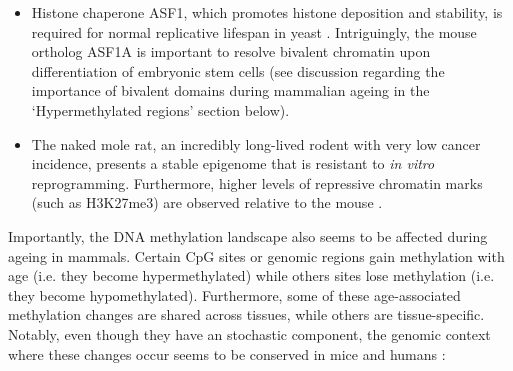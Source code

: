 \begin{itemize}
	\item Histone chaperone ASF1, which promotes histone deposition and stability, is required for normal replicative lifespan in yeast \citep{Feser2010}. Intriguingly, the mouse ortholog ASF1A is important to resolve bivalent chromatin upon differentiation of embryonic stem cells \citep{Gao2018} (see discussion regarding the importance of bivalent domains during mammalian ageing in the `Hypermethylated regions' section below).
	
	\item The naked mole rat, an incredibly long-lived rodent with very low cancer incidence, presents a stable epigenome that is resistant to \textit{in vitro} reprogramming. Furthermore, higher levels of repressive chromatin marks (such as H3K27me3) are observed relative to the mouse \citep{Tan2017}. 
	
\end{itemize}

Importantly, the DNA methylation landscape also seems to be affected during ageing in mammals. Certain CpG sites or genomic regions gain methylation with age (i.e. they become hypermethylated) while others sites lose methylation (i.e. they become hypomethylated). Furthermore, some of these age-associated methylation changes are shared across tissues, while others are tissue-specific. Notably, even though they have an stochastic component, the genomic context where these changes occur seems to be conserved in mice \citep{Maegawa2010,Avrahami2015,Wang2017,Cole2017,Sziraki2018} and humans \citep{Rakyan2010,Teschendorff2010,Horvath2012,Heyn2012,Day2013,Raddatz2013,Weidner2014,Fernandez2015,Dozmorov2015,Yuan2015,Slieker2016,Slieker2018,Zhu2018}:

